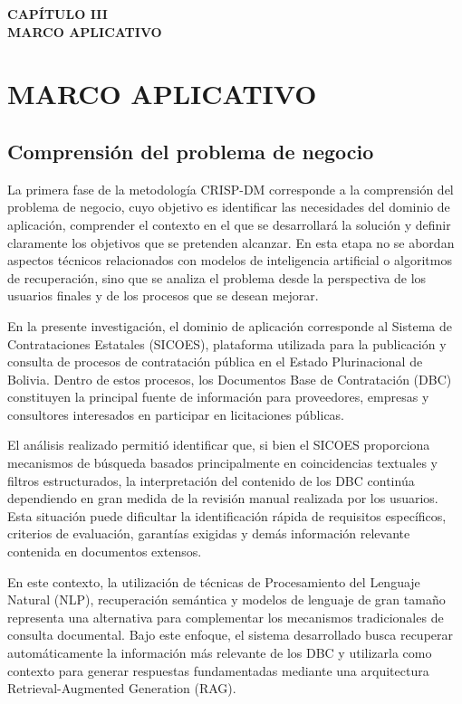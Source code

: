 \newpage
\thispagestyle{empty}
\vspace*{0.35\textheight}
\begin{center}
    {\Huge\textbf{CAPÍTULO III}} \\[0.5cm]
    {\Huge\textbf{MARCO APLICATIVO}}
\end{center}

\newpage
\chapter{MARCO APLICATIVO}

\section{Comprensión del problema de negocio}

La primera fase de la metodología CRISP-DM corresponde a la comprensión del problema de negocio, cuyo objetivo es identificar las necesidades del dominio de aplicación, comprender el contexto en el que se desarrollará la solución y definir claramente los objetivos que se pretenden alcanzar. En esta etapa no se abordan aspectos técnicos relacionados con modelos de inteligencia artificial o algoritmos de recuperación, sino que se analiza el problema desde la perspectiva de los usuarios finales y de los procesos que se desean mejorar.

En la presente investigación, el dominio de aplicación corresponde al Sistema de Contrataciones Estatales (SICOES), plataforma utilizada para la publicación y consulta de procesos de contratación pública en el Estado Plurinacional de Bolivia. Dentro de estos procesos, los Documentos Base de Contratación (DBC) constituyen la principal fuente de información para proveedores, empresas y consultores interesados en participar en licitaciones públicas.

El análisis realizado permitió identificar que, si bien el SICOES proporciona mecanismos de búsqueda basados principalmente en coincidencias textuales y filtros estructurados, la interpretación del contenido de los DBC continúa dependiendo en gran medida de la revisión manual realizada por los usuarios. Esta situación puede dificultar la identificación rápida de requisitos específicos, criterios de evaluación, garantías exigidas y demás información relevante contenida en documentos extensos.

En este contexto, la utilización de técnicas de Procesamiento del Lenguaje Natural (NLP), recuperación semántica y modelos de lenguaje de gran tamaño representa una alternativa para complementar los mecanismos tradicionales de consulta documental. Bajo este enfoque, el sistema desarrollado busca recuperar automáticamente la información más relevante de los DBC y utilizarla como contexto para generar respuestas fundamentadas mediante una arquitectura Retrieval-Augmented Generation (RAG).

